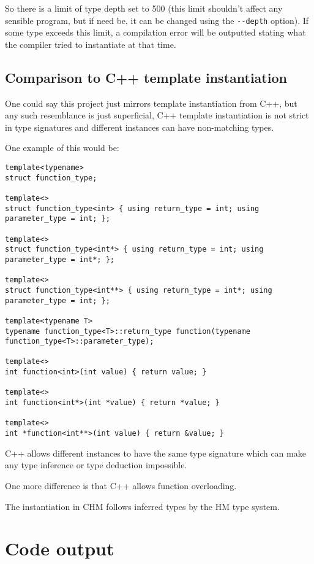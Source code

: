 So there is a limit of type depth set to 500 (this limit shouldn't affect any sensible program, but if need be, it can be changed using the \lstinline[language=sh]{--depth} option). If some type exceeds this limit, a compilation error will be outputted stating what the compiler tried to instantiate at that time.

\subsection{Comparison to C++ template instantiation}

One could say this project just mirrors template instantiation from C++, but any such resemblance is just superficial, C++ template instantiation is not strict in type signatures and different instances can have
non-matching types.

One example of this would be:


\begin{lstlisting}
template<typename>
struct function_type;

template<>
struct function_type<int> { using return_type = int; using parameter_type = int; };

template<>
struct function_type<int*> { using return_type = int; using parameter_type = int*; };

template<>
struct function_type<int**> { using return_type = int*; using parameter_type = int; };

template<typename T>
typename function_type<T>::return_type function(typename function_type<T>::parameter_type);

template<>
int function<int>(int value) { return value; }

template<>
int function<int*>(int *value) { return *value; }

template<>
int *function<int**>(int value) { return &value; }
\end{lstlisting}

C++ allows different instances to have the same type signature which can make any type inference or type deduction impossible.

One more difference is that C++ allows function overloading. %

The instantiation in CHM follows inferred types by the HM type system.

\section{Code output}

